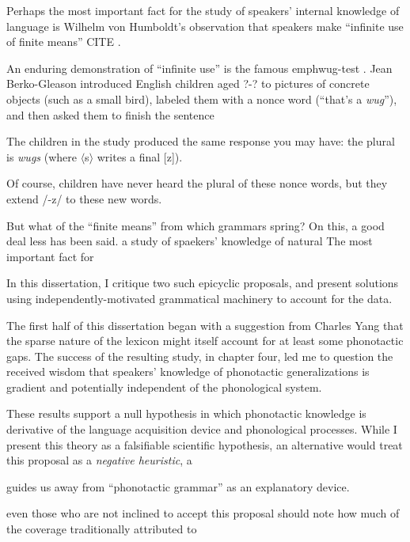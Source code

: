 Perhaps the most important fact for the study of speakers' internal knowledge of language is Wilhelm von Humboldt's observation that speakers make ``infinite use of finite means'' CITE \citep{Chomsky1966}. 

An enduring demonstration of ``infinite use'' is the famous emph{wug-test} \citep{Berko1958}. Jean Berko-Gleason introduced English children aged ?-? to pictures of concrete objects (such as a small bird), labeled them with a nonce word (``that's a \emph{wug}''), and then asked them to finish the sentence

The children in the study produced the same response you may have: the plural is \emph{wugs} (where $\langle$s$\rangle$ writes a final [z]). 

Of course, children have never heard the plural of these nonce words, but they extend /-z/ to these new words. 

But what of the ``finite means'' from which grammars spring? On this, a good deal less has been said.
a study of spaekers' knowledge of natural
The most important fact for 

In this dissertation, I critique two such epicyclic proposals, and present solutions using independently-motivated grammatical machinery to account for the data. 

The first half of this dissertation began with a suggestion from Charles Yang that the sparse nature of the lexicon might itself account for at least some phonotactic gaps. The success of the resulting study, in chapter four, led me to question the received wisdom that speakers' knowledge of phonotactic generalizations is gradient and potentially independent of the phonological system. 

These results support a null hypothesis in which phonotactic knowledge is derivative of the language acquisition device and phonological processes. While I present this theory as a falsifiable scientific hypothesis, an alternative would treat this proposal as a \emph{negative heuristic}, a 

guides us away from ``phonotactic grammar'' as an explanatory device. 

even those who are not inclined to accept this proposal should note how much of the coverage traditionally attributed to
